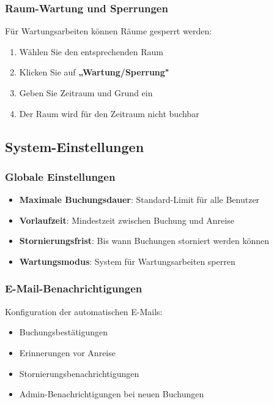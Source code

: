 \subsubsection{Raum-Wartung und Sperrungen}

Für Wartungsarbeiten können Räume gesperrt werden:

\begin{enumerate}
    \item Wählen Sie den entsprechenden Raum
    \item Klicken Sie auf \textbf{„Wartung/Sperrung"}
    \item Geben Sie Zeitraum und Grund ein
    \item Der Raum wird für den Zeitraum nicht buchbar
\end{enumerate}

\subsection{System-Einstellungen}

\subsubsection{Globale Einstellungen}

\begin{itemize}
    \item \textbf{Maximale Buchungsdauer}: Standard-Limit für alle Benutzer
    \item \textbf{Vorlaufzeit}: Mindestzeit zwischen Buchung und Anreise
    \item \textbf{Stornierungsfrist}: Bis wann Buchungen storniert werden können
    \item \textbf{Wartungsmodus}: System für Wartungsarbeiten sperren
\end{itemize}

\subsubsection{E-Mail-Benachrichtigungen}

Konfiguration der automatischen E-Mails:

\begin{itemize}
    \item Buchungsbestätigungen
    \item Erinnerungen vor Anreise
    \item Stornierungsbenachrichtigungen
    \item Admin-Benachrichtigungen bei neuen Buchungen
\end{itemize}

